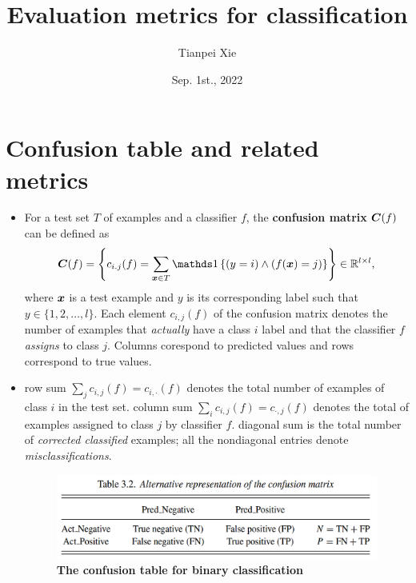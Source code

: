 \documentclass[11pt]{article}
\begin{document}
\title{Evaluation metrics for classification}
\author{ Tianpei Xie}
\date{Sep. 1st., 2022 }
\maketitle
\tableofcontents
\newpage
\allowdisplaybreaks
\section{Confusion table and related metrics}
\begin{itemize}
\item For a test set $T$ of examples and a classifier $f$, the \textbf{confusion matrix} \citep{japkowicz2011evaluating} $\boldsymbol{C}(f)$ can be defined as
\begin{align}
\mb{C}(f) = \set{c_{i.j}(f ) = \sum_{\mb{x} \in T}\ind{(y = i) \land (f(\mb{x}) = j)}} \in \bR^{l \times l},
\end{align} where $\boldsymbol{x}$ is a test example and $y$ is its corresponding label such that $y \in \{1, 2, \ldots, l\}$. Each element $c_{i,j}(f)$ of the confusion matrix denotes the number of examples that \emph{actually} have a class $i$ label and that the classifier $f$ \emph{assigns} to class $j$. Columns corespond to predicted values and rows correspond to true values. 

\item row sum $\sum_{j}c_{i,j}(f) = c_{i,\cdot}(f)$ denotes the total number of examples of class $i$ in the test set.
column sum $\sum_{i}c_{i,j}(f) = c_{\cdot,j}(f)$ denotes the total of examples assigned to class $j$ by classifier $f$.
diagonal sum is the total number of \emph{corrected classified} examples; all the nondiagonal entries denote \emph{misclassifications}.

\begin{figure}
\begin{minipage}[t]{1\linewidth}
  \centering
  \centerline{\includegraphics[scale = 0.35]{confusion_tab.png}}
\end{minipage}
\caption{\footnotesize{\textbf{The confusion table for binary classification}}}
\label{fig: confusion_tab}
\end{figure}


\end{itemize}
\end{document}
